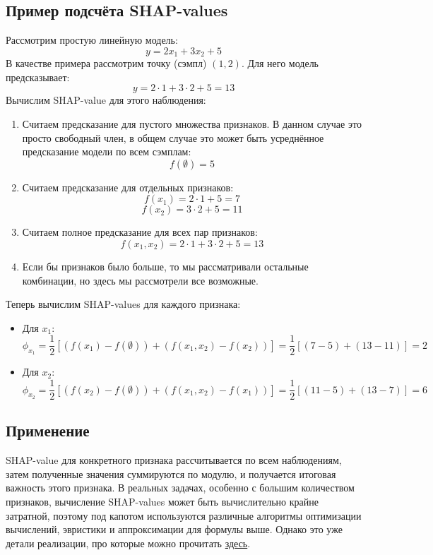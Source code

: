 \subsection*{Пример подсчёта SHAP-values}
Рассмотрим простую линейную модель:
$$ y = 2x_1 + 3x_2 + 5 $$
В качестве примера рассмотрим точку (сэмпл) $(1, 2)$. Для него модель предсказывает:
$$ y = 2 \cdot 1 + 3 \cdot 2 + 5 = 13 $$
Вычислим SHAP-value для этого наблюдения:
\begin{enumerate}
    \item Считаем предсказание для пустого множества признаков. В данном случае это просто свободный член, в общем случае это может быть усреднённое предсказание модели по всем сэмплам:
        $$ f(\emptyset) = 5 $$

    \item Считаем предсказание для отдельных признаков:
        $$ f(x_1) = 2 \cdot 1 + 5 = 7 $$
        $$ f(x_2) = 3 \cdot 2 + 5 = 11 $$

    \item Считаем полное предсказание для всех пар признаков:  
        $$ f(x_1, x_2) = 2 \cdot 1 + 3 \cdot 2 + 5 = 13 $$

    \item Если бы признаков было больше, то мы рассматривали остальные комбинации, но здесь мы рассмотрели все возможные.
\end{enumerate}

Теперь вычислим SHAP-values для каждого признака:
\begin{itemize}
    \item Для $x_1$:  
        $$
        \phi_{x_1} = \frac{1}{2} \left[ (f(x_1) - f(\emptyset)) + (f(x_1, x_2) - f(x_2)) \right] = \frac{1}{2} \left[ (7 - 5) + (13 - 11) \right] = 2
        $$
    \item Для $x_2$:
        $$
        \phi_{x_2} = \frac{1}{2} \left[ (f(x_2) - f(\emptyset)) + (f(x_1, x_2) - f(x_1)) \right] = \frac{1}{2} \left[ (11 - 5) + (13 - 7) \right] = 6
        $$
\end{itemize}

\subsection*{Применение}
SHAP-value для конкретного признака рассчитывается по всем наблюдениям, затем полученные значения суммируются по модулю, и получается итоговая важность этого признака.
В реальных задачах, особенно с большим количеством признаков, вычисление SHAP-values может быть вычислительно крайне затратной, поэтому под капотом используются различные алгоритмы оптимизации вычислений, эвристики и аппроксимации для формулы выше. Однако это уже детали реализации, про которые можно прочитать \href{https://github.com/shap/shap}{здесь}.


